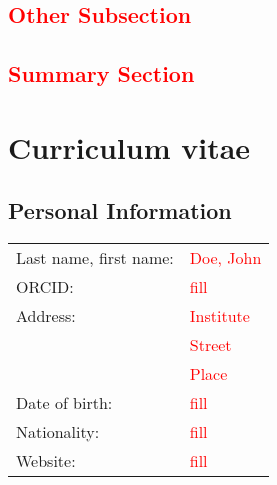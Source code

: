 \documentclass[STG]{ercgrant}
\begin{document}
\subsection{\textcolor{red}{Other Subsection}}

\textcolor{red}{\blindtext[2]}

\subsection{\textcolor{red}{Summary Section}}

\textcolor{red}{\blindtext[2]}


\nocite{*} %

\renewcommand\bibsection{\subsection{\refname}}
\begin{small}
	
	
\end{small}

\newpage
\section{Curriculum vitae}

\subsection{Personal Information}
\begin{tabular}{p{5cm}l}
	Last name, first name: & \textcolor{red}{Doe, John} \\
	ORCID:                 & \textcolor{red}{fill}      \\
	Address:               & \textcolor{red}{Institute} \\
	                       & \textcolor{red}{Street}    \\
	                       & \textcolor{red}{Place}     \\
	Date of birth:         & \textcolor{red}{fill}      \\
	Nationality:           & \textcolor{red}{fill}      \\
	Website:               & \textcolor{red}{fill}      \\
\end{tabular}
\end{document}
